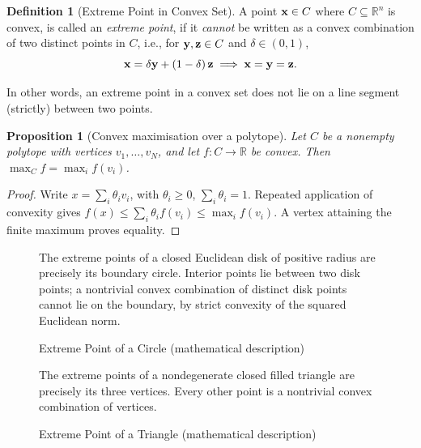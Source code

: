 \documentclass[11pt]{article}
\newtheorem{proposition}[theorem]{Proposition}
\theoremstyle{definition}
\newtheorem{definition}[theorem]{Definition}
\theoremstyle{remark}
\newcommand{\pqty}[1]{\left(#1\right)}
\newcommand{\oointv}[2]{(#1,#2)}
\newcommand{\RR}{\mathbb{R}}
\begin{document}
\begin{definition}[Extreme Point in Convex Set]\label{optim-unit-0046}
    A point \(\vb{x} \in C\) where \(C \subseteq \RR^n\) is convex, is called an \emph{extreme point}, if it \emph{cannot} be written as a convex combination of two distinct points in \(C\), i.e., for \(\vb{y}, \vb{z} \in C\) and \(\delta \in \oointv{0}{1}\),
    \[
        \vb{x} = \delta \vb{y} + \pqty{1 - \delta} \vb{z} \implies \vb{x} = \vb{y} = \vb{z}.
    \]
\end{definition}

In other words, an extreme point in a convex set does not lie on a line segment (strictly) between two points.

\begin{proposition}[Convex maximisation over a polytope]\label{optim-unit-0047}
Let \(C\) be a nonempty polytope with vertices \(v_1,\ldots,v_N\), and let
\(f:C\to\RR\) be convex. Then \(\max_C f=\max_i f(v_i)\).
\end{proposition}
\begin{proof}
Write \(x=\sum_i\theta_i v_i\), with \(\theta_i\ge0\), \(\sum_i\theta_i=1\).
Repeated application of convexity gives \(f(x)\le\sum_i\theta_i f(v_i)\le\max_i f(v_i)\).
A vertex attaining the finite maximum proves equality.
\end{proof}

\begin{figure}[ht!]\centering\begin{minipage}{0.94\linewidth}The extreme points of a closed Euclidean disk of positive radius are precisely its boundary circle. Interior points lie between two disk points; a nontrivial convex combination of distinct disk points cannot lie on the boundary, by strict convexity of the squared Euclidean norm.\end{minipage}\caption{Extreme Point of a Circle (mathematical description)}\label{fig:circle-extreme-point}\end{figure}

\begin{figure}[ht!]\centering\begin{minipage}{0.94\linewidth}The extreme points of a nondegenerate closed filled triangle are precisely its three vertices. Every other point is a nontrivial convex combination of vertices.\end{minipage}\caption{Extreme Point of a Triangle (mathematical description)}\label{fig:triangle-extreme-point}\end{figure}
\end{document}
